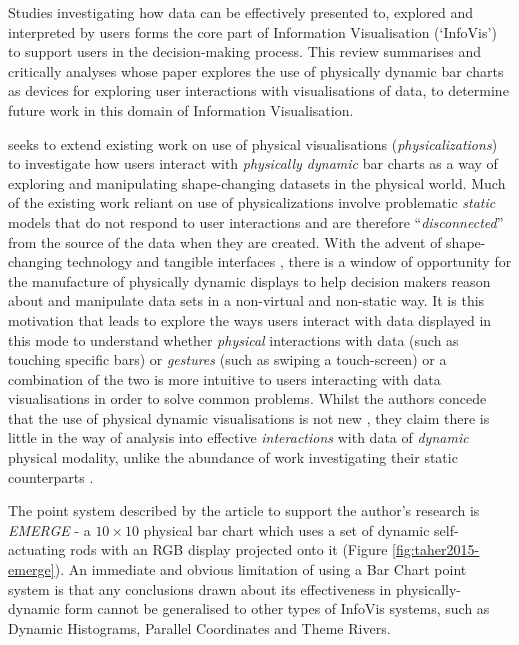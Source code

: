 \documentclass[11pt]{article}
\begin{document}

Studies investigating how data can be effectively presented to, explored and interpreted by users forms the core part of Information Visualisation (`InfoVis') to support users in the decision-making process. This review summarises and critically analyses \citet{taher2015} whose paper explores the use of physically dynamic bar charts as devices for exploring user interactions with visualisations of data, to determine future work in this domain of Information Visualisation.

\citeauthor{taher2015} seeks to extend existing work on use of physical visualisations (\textit{physicalizations}) \citep{jansen2015} to investigate how users interact with \textit{physically dynamic} bar charts as a way of exploring and manipulating shape-changing datasets in the physical world. Much of the existing work reliant on use of physicalizations involve problematic \textit{static} models that do not respond to user interactions \citep{jansen2013} and are therefore ``\textit{disconnected}'' from the source of the data when they are created. With the advent of shape-changing technology and tangible interfaces \citep{rasmussen2012}, there is a window of opportunity for the manufacture of physically dynamic displays to help decision makers reason about and manipulate data sets in a non-virtual and non-static way. It is this motivation that leads \citeauthor{taher2015} to explore the ways users interact with data displayed in this mode to understand whether \textit{physical} interactions with data (such as touching specific bars) or \textit{gestures} (such as swiping a touch-screen) or a combination of the two is more intuitive to users interacting with data visualisations in order to solve common problems. Whilst the authors concede that the use of physical dynamic visualisations is not new \citep{leithinger2010,follmer2013}, they claim there is little in the way of analysis into effective \textit{interactions} with data of \textit{dynamic} physical modality, unlike the abundance of work investigating their static counterparts \citep{stusak2014}.

The point system described by the article to support the author's research is \textit{EMERGE} - a $10\times10$ physical bar chart which uses a set of dynamic self-actuating rods with an RGB display projected onto it (Figure \ref{fig:taher2015-emerge}). An immediate and obvious limitation of using a Bar Chart point system is that any conclusions drawn about its effectiveness in physically-dynamic form cannot be generalised to other types of InfoVis systems, such as Dynamic Histograms, Parallel Coordinates and Theme Rivers. 
\end{document}
